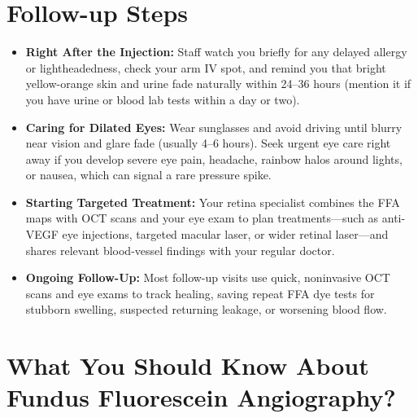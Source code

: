 \section{Follow-up Steps}

\begin{itemize}
    \item \textbf{Right After the Injection:} Staff watch you briefly for any delayed allergy or lightheadedness, check your arm IV spot, and remind you that bright yellow-orange skin and urine fade naturally within 24--36 hours (mention it if you have urine or blood lab tests within a day or two).
    \item \textbf{Caring for Dilated Eyes:} Wear sunglasses and avoid driving until blurry near vision and glare fade (usually 4--6 hours). Seek urgent eye care right away if you develop severe eye pain, headache, rainbow halos around lights, or nausea, which can signal a rare pressure spike.
    \item \textbf{Starting Targeted Treatment:} Your retina specialist combines the FFA maps with OCT scans and your eye exam to plan treatments---such as anti-VEGF eye injections, targeted macular laser, or wider retinal laser---and shares relevant blood-vessel findings with your regular doctor.
    \item \textbf{Ongoing Follow-Up:} Most follow-up visits use quick, noninvasive OCT scans and eye exams to track healing, saving repeat FFA dye tests for stubborn swelling, suspected returning leakage, or worsening blood flow.
\end{itemize}


\section{What You Should Know About Fundus Fluorescein Angiography?}


